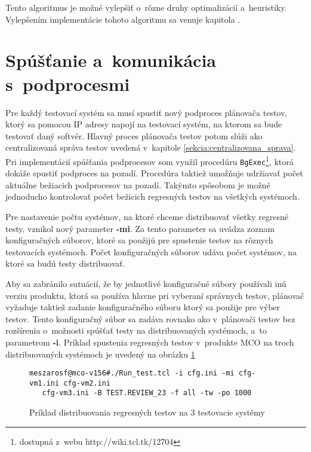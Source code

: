 Tento algoritmus je možné vylepšiť o~rôzne druhy optimalizácií a~heuristiky.
Vylepšením implementácie tohoto algoritmu sa venuje kapitola \label{kapitola:optimalizacie}. 


\section{Spúšťanie a~komunikácia s~podprocesmi}
\label{sekcia:spustanie_podprocesov}
Pre každý testovací systém sa musí spustiť nový podproces plánovača testov,
ktorý sa pomocou IP adresy napojí na testovací systém, na ktorom sa bude testovať daný softvér.
Hlavný proces plánovača testov potom slúži ako centralizovaná správa testov uvedená
v~kapitole \ref{sekcia:centralizovana_sprava}.
Pri implementácií spúšťania podprocesov som využil procedúru \texttt{BgExec}\footnote{dostupná z~webu http://wiki.tcl.tk/12704},
ktorá dokáže spustiť podproces na pozadí. Procedúra taktiež umožňuje udržiavať počet aktuálne bežiacich podprocesov na pozadí.
Takýmto spôsobom je možné jednoducho kontrolovať počet bežicich regresných testov na všetkých systémoch.

Pre nastavenie počtu systémov, na ktoré chceme distribuovať všetky regresné testy, vznikol nový parameter \textbf{-mi}.
Za tento parameter sa uvádza zoznam konfiguračných súborov, ktoré sa použijú pre spustenie testov na rôznych
testovacích systémoch. Počet konfiguračných súborov udáva počet systémov, na ktoré sa budú testy distribuovať.

Aby sa zabránilo sutuácií, že by jednotlivé konfiguračné súbory používali inú verziu produktu, ktorá sa
používa hlavne pri vyberaní správnych testov, plánovač vyžaduje taktiež zadanie konfiguračného súboru ktorý
sa použije pre výber testov. Tento konfiguračný súbor sa zadáva rovnako ako v~plánovači testov bez rozšírenia
o~možnosti spúšťať testy na distribuovaných systémoch, a~to parametrom \textbf{-i}.
Príklad spustenia regresných testov v~produkte MCO na troch distribuovaných systémoch je uvedený na obrázku 
\ref{obrazok:priklad_spustania_testov_paralelne}

\begin{figure}[h]
\begin{lstlisting}
meszarosf@mco-v156#./Run_test.tcl -i cfg.ini -mi cfg-vm1.ini cfg-vm2.ini 
   cfg-vm3.ini -B TEST.REVIEW_23 -f all -tw -po 1000
\end{lstlisting}
\caption{Príklad distribuovania regresných testov na 3 testovacie systémy}
\label{obrazok:priklad_spustania_testov_paralelne}
\end{figure}

